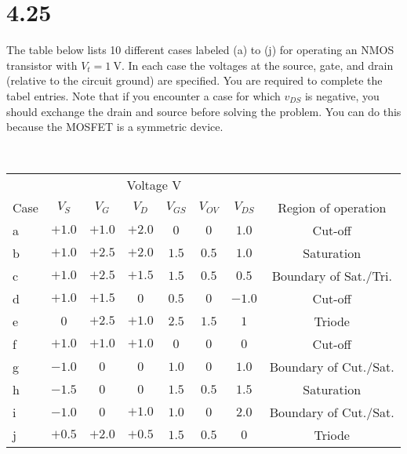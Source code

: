 \documentclass[12pt, a4paper]{article}
\begin{document}
\section{4.25}
The table below lists 10 different cases labeled (a) to (j) for operating an NMOS transistor with $V_t = \SI{1}{\V} $. In each case the voltages at the source, gate, and drain (relative to the circuit ground) are specified. You are required to complete the tabel entries. Note that if you encounter a case for which $v_{DS}$ is negative, you should exchange the drain and source before solving the problem. You can do this because the MOSFET is a symmetric device.


\Ans \\
\begin{center}
  \begin{tabular}{|l|c|c|c|c|c|c|c|}
    \hline
    & \multicolumn{6}{c|}{Voltage \si\V} & \\ \cline{2-7}
    Case & $V_S$ & $V_G$ & $V_D$ & $V_{GS}$ & $V_{OV}$ & $V_{DS}$ & Region of operation \\
    \hline
    a & $+1.0$ & $+1.0$ & $+2.0$ & $0$ & $0$ & $1.0$ & Cut-off \\
    b & $+1.0$ & $+2.5$ & $+2.0$ & $1.5$ & $0.5$ & $1.0$ & Saturation \\
    c & $+1.0$ & $+2.5$ & $+1.5$ & $1.5$ & $0.5$ & $0.5$ & Boundary of Sat./Tri. \\
    d & $+1.0$ & $+1.5$ & $0$ & $0.5$ & $0$ & $-1.0$ & Cut-off \\
    e & $0$ & $+2.5$ & $+1.0$ & $2.5$ & $1.5$ & $1$ & Triode \\
    f & $+1.0$ & $+1.0$ & $+1.0$ & $0$ & $0$ & $0$ & Cut-off \\
    g & $-1.0$ & $0$ & $0$ & $1.0$ & $0$ & $1.0$ & Boundary of Cut./Sat. \\
    h & $-1.5$ & $0$ & $0$ & $1.5$ & $0.5$ & $1.5$ & Saturation \\
    i & $-1.0$ & $0$ & $+1.0$ & $1.0$ & $0$ & $2.0$ & Boundary of Cut./Sat. \\
    j & $+0.5$ & $+2.0$ & $+0.5$ & $1.5$ & $0.5$ & $0$ & Triode \\
    \hline
  \end{tabular}
\end{center}

\clearpage
\end{document}
